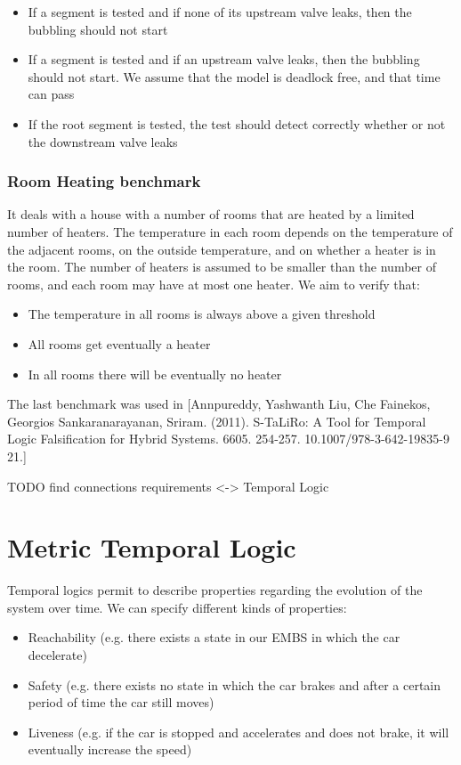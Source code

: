 \begin{itemize}
	\item If a segment is tested and if none of its upstream valve leaks, then the bubbling should not start
	\item If a segment is tested and if an upstream valve leaks, then the bubbling should not start. We assume that the model is deadlock free, and that time can pass
	\item If the root segment is tested, the test should detect correctly whether or not the downstream valve leaks
\end{itemize}

\subsubsection{Room Heating benchmark}

It deals with a house with a number of rooms that are heated by a limited number of heaters. The temperature in each room depends on the temperature of the adjacent rooms, on the outside temperature, and on whether a heater is in the room. The number of heaters is assumed to be smaller than the number of rooms, and each room may have at most one heater. We aim to verify that:

\begin{itemize}
	\item The temperature in all rooms is always above a given threshold
	\item All rooms get eventually a heater
	\item In all rooms there will be eventually no heater
\end{itemize}

The last benchmark was used in [Annpureddy, Yashwanth Liu, Che  Fainekos, Georgios  Sankaranarayanan, Sriram. (2011). S-TaLiRo: A Tool for Temporal Logic Falsification for Hybrid Systems. 6605. 254-257. 10.1007/978-3-642-19835-9 21.]

TODO find connections requirements <-> Temporal Logic

\section{Metric Temporal Logic}

Temporal logics permit to describe properties regarding the evolution of the system over time. We can specify different kinds of properties:

\begin{itemize}
	\item Reachability (e.g. there exists a state in our EMBS in which the car decelerate)
	\item Safety (e.g. there exists no state in which the car brakes and after a certain period of time the car still moves)
	\item Liveness (e.g. if the car is stopped and accelerates and does not brake, it will eventually increase the speed)
\end{itemize}

